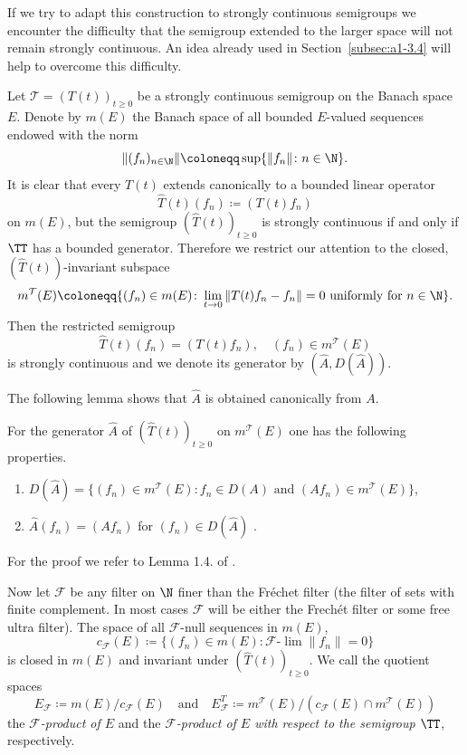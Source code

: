 If we try to adapt this construction to strongly continuous semigroups we encounter the difficulty that the semigroup extended to the larger space will not remain strongly continuous.
An idea already used in Section~\ref{subsec:a1-3.4} will help to overcome this difficulty.

Let $\mathcal{T} = (T(t))_{t \geq 0}$ be a strongly continuous semigroup on the Banach space $E$.
Denote by $m(E)$ the Banach space of all bounded $E$-valued sequences endowed with the norm
\[
    \|(f_{n})_{n \in \N}\| \coloneqq \sup \{\|f_{n}\| \colon n \in \N\} .
\]
It is clear that every $T(t)$ extends canonically to a bounded linear operator
\[
    \widehat{T}(t)(f_{n}) \coloneqq (T(t)f_{n})
\]
on $m(E)$, but the semigroup $(\widehat{T}(t))_{t \geq 0}$ is strongly continuous if and only if\/ $\TT$ has a bounded generator.
Therefore we restrict our attention to the closed, $(\widehat{T}(t))$-invariant subspace
\[
    m^{\mathcal{T}}(E) \coloneqq \{(f_{n}) \in m(E) \colon \lim_{t \to 0} \|T(t)f_{n}-f_{n}\| = 0 \text{ uniformly for } n \in \N\} .
\]
Then the restricted semigroup
\[
    \widehat{T}(t)(f_{n}) = (T(t)f_{n}), \quad (f_{n}) \in m^{\mathcal{T}}(E)
\]
is strongly continuous and we denote its generator by $(\widehat{A},D(\widehat{A}))$.

The following lemma shows that $\widehat{A}$ is obtained canonically from $A$.
\begin{lemma*}\label{lem:a1-3.6}
For the generator $\widehat{A}$ of\/ $(\widehat{T}(t))_{t \geq 0}$ on $m^{\mathcal{T}}(E)$ one has the following properties.
\begin{enumerate}[\upshape(i)]

\item 
$D(\widehat{A}) = \{(f_{n}) \in m^{\mathcal{T}}(E) \colon f_{n} \in D(A) \text{ and } (Af_{n}) \in m^{\mathcal{T}}(E)\}$,

\item 
$\widehat{A}(f_{n}) = (Af_{n})$ for $(f_{n}) \in D(\widehat{A})$ .
\end{enumerate}

\end{lemma*}
For the proof we refer to Lemma 1.4. of \textcite{derndinger:1980}.

Now let $\mathcal{F}$ be any filter on $\N$ finer than the Fréchet filter (\ie the filter of sets with finite complement. In most cases $\mathcal{F}$ will be either the Frechét filter or some free ultra filter).
The space of all $\mathcal{F}$-null sequences in $m(E)$, \ie
\[
    c_{\mathcal{F}}(E) \coloneqq \{(f_{n}) \in m(E) \colon \mathcal{F}\text{-}\lim\|f_{n}\| = 0\}
\]
is closed in $m(E)$ and invariant under $(\widehat{T}(t))_{t \geq 0}$. 
We call the quotient spaces
\[
    E_{\mathcal{F}} \coloneqq m(E)/c_{\mathcal{F}}(E) 
    \quad \text{and} \quad 
    E_{\mathcal{F}}^{T} \coloneqq m^{\mathcal{T}}(E)/ (c_{\mathcal{F}}(E)\cap m^{\mathcal{T}}(E))
\]
the \emph{$\mathcal{F}$-product of\/ $E$} and the \emph{$ \mathcal{F} $-product of\/ $E$ with respect to the semigroup $\TT$}, respectively.

